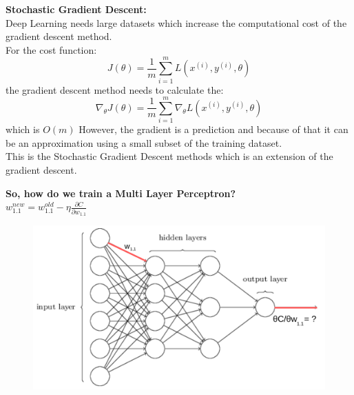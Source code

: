 \documentclass[10pt, compress]{beamer}
\begin{document}
\begin{frame}
  \vspace{.5cm}
  \textbf{Stochastic Gradient Descent:}\\
  Deep Learning needs large datasets which increase the computational cost of the gradient descent method.\\
  For the cost function:
  \begin{equation}
    J(\theta) = \frac{1}{m}\sum_{i=1}^{m} L(x^{(i)}, y^{(i)},\theta)
    \nonumber
  \end{equation}
  the gradient descent method needs to calculate the:
  \begin{equation}
    \nabla_\theta J(\theta) = \frac{1}{m}\sum_{i=1}^{m} \nabla_\theta L(x^{(i)}, y^{(i)},\theta)
    \nonumber
  \end{equation}
  which is $O(m)$
  However, the gradient is a prediction and because of that it can be an approximation using a small subset of the training dataset.\\
  This is the Stochastic Gradient Descent methods which is an extension of the gradient descent.
\end{frame}

\begin{frame}
  \textbf{So, how do we train a Multi Layer Perceptron?} \\
  \Large{$w_{1.1}^{new} = w_{1.1}^{old} - \eta \frac{\partial C}{\partial w_{1.1}}$}
  \begin{figure}
    \includegraphics[width=.8\linewidth]{imgs/mlp_backprop}
  \end{figure}
\end{frame}
\end{document}
